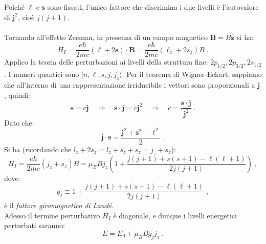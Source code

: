 \documentclass[10pt,a4paper]{report}
\theoremstyle{definition}
\numberwithin{equation}{section}
\newcommand{\ket}{\rangle}
\begin{document}
Poiché $\boldsymbol{\ell}$ e $\mathbf{s}$ sono fissati, l'unico fattore che discrimina i due livelli è l'autovalore di $\mathbf{j}^2$, cioè $j(j+1)$. \\
\\
Tornando all'effetto Zeeman, in presenza di un campo magnetico $\mathbf{B}=B\hat{\mathbf{z}}$ si ha:
\begin{equation}
H_I=\frac{e\hbar}{2mc}(\boldsymbol{\ell}+2\mathbf{s})\cdot\mathbf{B}=\frac{e\hbar}{2mc}(\ell_z+2s_z)B\;.
\end{equation}
Applico la teoria delle perturbazioni ai livelli della struttura fine: $2p_{1/2},2p_{3/2},2s_{1/2}$. I numeri quantici sono $|n,\ell,s,j,j_z\ket$. Per il teorema di Wigner-Eckart, sappiamo che all'interno di una rappresentazione irriducibile i vettori sono proporzionali a $\mathbf{j}$, quindi:
\begin{equation}
\mathbf{s}=c\mathbf{j}\quad \Longrightarrow \quad \mathbf{s}\cdot\mathbf{j}=c\mathbf{j}^2\quad \Longrightarrow\quad c=\frac{\mathbf{s}\cdot\mathbf{j}}{\mathbf{j}^2}\;.
\end{equation}
Dato che:
\begin{equation}
\mathbf{j}\cdot\mathbf{s}=\frac{\mathbf{j}^2+\mathbf{s}^2-\boldsymbol{\ell}^2}{2}\;.
\end{equation}
Si ha (ricordando che $l_z+2s_z=l_z+s_z+s_z=j_z+s_z$):
\begin{equation}
H_I=\frac{e\hbar}{2mc}(j_z+s_z)B=\mu_BBj_z\left(1+\frac{j(j+1)+s(s+1)-\ell(\ell+1)}{2j(j+1)}\right)\;,
\end{equation}
dove:
\begin{equation}
g_j\equiv 1+\frac{j(j+1)+s(s+1)-\ell(\ell+1)}{2j(j+1)}\;,
\end{equation}
è il \textit{fattore giromagnetico di Landé}. \\
Adesso il termine perturbativo $H_I$ è diagonale, e dunque i livelli energetici perturbati saranno:
\begin{equation}
E=E_0+\mu_BBg_jj_z\;.
\end{equation}
\end{document}
